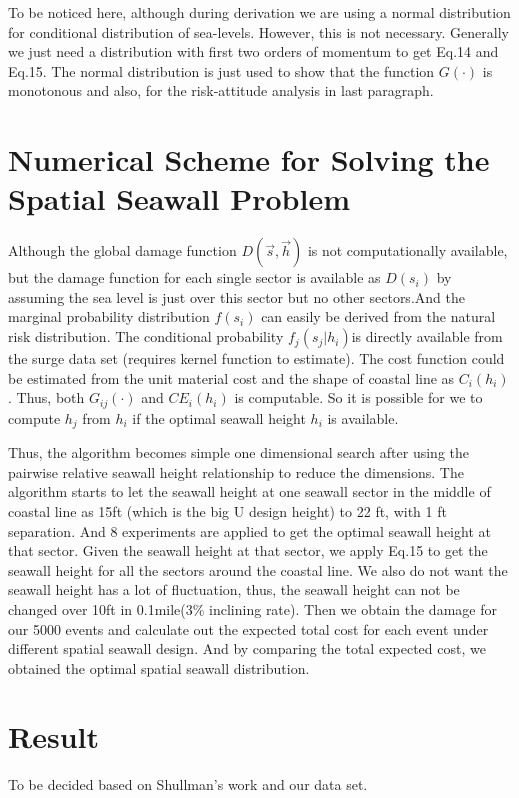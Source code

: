 \documentclass{article}
\begin{document}
To be noticed here, although during derivation we are using a normal distribution for conditional distribution of sea-levels. However, this is not necessary. Generally we just need a distribution with first two orders of momentum to get Eq.14 and Eq.15. The normal distribution is just used to show that the function $G(\cdot)$ is monotonous and also, for the risk-attitude analysis in last paragraph.

\section{Numerical Scheme for Solving the Spatial Seawall Problem}
Although the global damage function $D(\vec{s},\vec{h})$ is not computationally available, but the damage function for each single sector is available as $D(s_i)$ by assuming the sea level is just over this sector but no other sectors.And the marginal probability distribution $f(s_i)$ can easily be derived from the natural risk distribution.  The conditional probability $f_j(s_j|h_i)$is directly available from the surge data set (requires kernel function to estimate). The cost function could be estimated from the unit material cost and the shape of coastal line as $C_i(h_i)$. Thus, both $G_{ij}(\cdot)$ and $CE_i(h_i)$  is computable. So it is possible for we to compute $h_j$ from $h_i$ if the optimal seawall height $h_i$ is available. 

Thus, the algorithm becomes simple one dimensional search after using the pairwise relative seawall height relationship to reduce the dimensions. The algorithm starts to let the seawall height at one seawall sector in the middle of coastal line as 15ft (which is the big U design height) to 22 ft, with 1 ft separation. And 8 experiments are applied to get the optimal seawall height at that sector. Given the seawall height at that sector, we apply Eq.15 to get the seawall height for all the sectors around the coastal line. We also do not want the seawall height has a lot of fluctuation, thus, the seawall height can not be changed over 10ft in 0.1mile(3\% inclining rate). Then we obtain the damage for our 5000 events and calculate out the expected total cost for each event under different spatial seawall design. And by comparing the total expected cost, we obtained the optimal spatial seawall distribution.

\section{Result}

To be decided based on Shullman's work and our data set.
\end{document}
